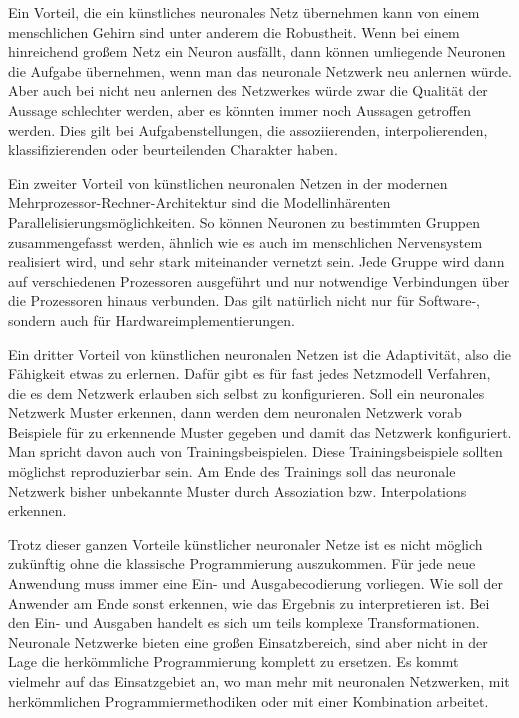 Ein Vorteil, die ein künstliches neuronales Netz übernehmen kann von einem menschlichen Gehirn sind unter anderem die Robustheit. Wenn bei einem hinreichend großem Netz ein Neuron ausfällt, dann können umliegende Neuronen die Aufgabe übernehmen, wenn man das neuronale Netzwerk neu anlernen würde. Aber auch bei nicht neu anlernen des Netzwerkes würde zwar die Qualität der Aussage schlechter werden, aber es könnten immer noch Aussagen getroffen werden. Dies gilt bei Aufgabenstellungen, die  assoziierenden, interpolierenden, klassifizierenden oder beurteilenden Charakter haben.

Ein zweiter Vorteil von künstlichen neuronalen Netzen in der modernen Mehrprozessor-Rechner-Architektur sind die Modellinhärenten Parallelisierungsmöglichkeiten. So können Neuronen zu bestimmten Gruppen zusammengefasst werden, ähnlich wie es auch im menschlichen Nervensystem realisiert wird, und sehr stark miteinander vernetzt sein. Jede Gruppe wird dann auf verschiedenen Prozessoren ausgeführt und nur notwendige Verbindungen über die Prozessoren hinaus verbunden. Das gilt natürlich nicht nur für Software-, sondern auch für Hardwareimplementierungen.

Ein dritter Vorteil von künstlichen neuronalen Netzen ist die Adaptivität, also die Fähigkeit etwas zu erlernen. Dafür gibt es für fast jedes Netzmodell Verfahren, die es dem Netzwerk erlauben sich selbst zu konfigurieren. Soll ein neuronales Netzwerk Muster erkennen, dann werden dem neuronalen Netzwerk vorab Beispiele für zu erkennende Muster gegeben und damit das Netzwerk konfiguriert. Man spricht davon auch von Trainingsbeispielen. Diese Trainingsbeispiele sollten möglichst reproduzierbar sein. Am Ende des Trainings soll das neuronale Netzwerk bisher unbekannte Muster durch Assoziation bzw. Interpolations erkennen.

Trotz dieser ganzen Vorteile künstlicher neuronaler Netze ist es nicht möglich zukünftig ohne die klassische Programmierung auszukommen. Für jede neue Anwendung muss immer eine Ein- und Ausgabecodierung vorliegen. Wie soll der Anwender am Ende sonst erkennen, wie das Ergebnis zu interpretieren ist. Bei den Ein- und Ausgaben handelt es sich um teils komplexe Transformationen. Neuronale Netzwerke bieten eine großen Einsatzbereich, sind aber nicht in der Lage die herkömmliche Programmierung komplett zu ersetzen. Es kommt vielmehr auf das Einsatzgebiet an, wo man mehr mit neuronalen Netzwerken, mit herkömmlichen Programmiermethodiken oder mit einer Kombination arbeitet.